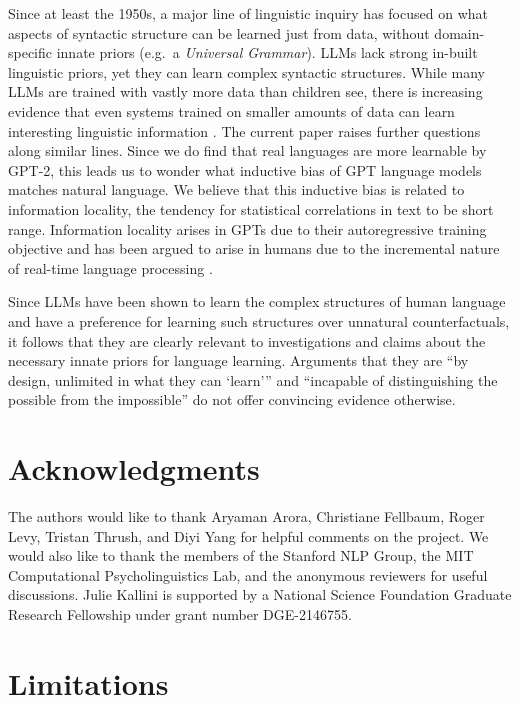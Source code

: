 \documentclass[11pt]{article}
\begin{document}
Since at least the 1950s, a major line of linguistic inquiry has focused on what aspects of syntactic structure can be learned just from data, without domain-specific innate priors (e.g.~a \emph{Universal Grammar}).
LLMs lack strong in-built linguistic priors, yet they can learn complex syntactic structures.
While many LLMs are trained with vastly more data than children see, there is increasing evidence that even systems trained on smaller amounts of data can learn interesting linguistic information \citep{warstadt2023papers}.
The current paper raises further questions along similar lines. Since we do find that real languages are more learnable by GPT-2, this leads us to wonder what inductive bias of GPT language models matches natural language.
We believe that this inductive bias is related to information locality, the tendency for statistical correlations in text to be short range.
Information locality arises in GPTs due to their autoregressive training objective and has been argued to arise in humans due to the incremental nature of real-time language processing \citep{futrell-2019-information,Hahn2021}.

Since LLMs have been shown to learn the complex structures of human language and have a preference for learning such structures over unnatural counterfactuals, it follows that they are clearly relevant to investigations and claims about the necessary innate priors for language learning.
Arguments that they are ``by design, unlimited in what they can `learn'''  and ``incapable of distinguishing the possible from the impossible'' \citep{chomsky2023nyt} do not offer convincing evidence otherwise.


\section{Acknowledgments}

The authors would like to thank Aryaman Arora, Christiane Fellbaum, Roger Levy, Tristan Thrush, and Diyi Yang for helpful comments on the project. We would also like to thank the members of the Stanford NLP Group, the MIT Computational Psycholinguistics Lab, and the anonymous reviewers for useful discussions. Julie Kallini is supported by a National Science Foundation Graduate Research Fellowship under grant number DGE-2146755.

\section{Limitations}
\end{document}
